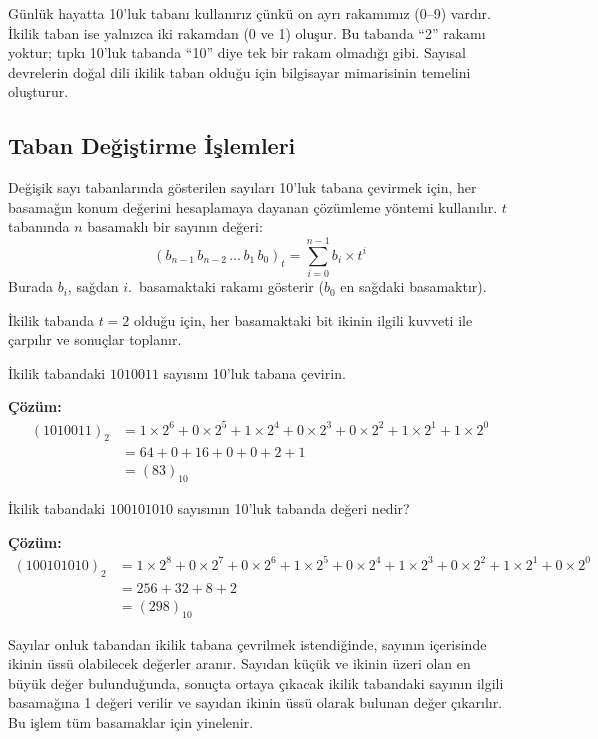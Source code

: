 Günlük hayatta 10'luk tabanı kullanırız çünkü on ayrı rakamımız (0--9) vardır. İkilik taban ise yalnızca iki rakamdan (0 ve 1) oluşur. Bu tabanda ``2'' rakamı yoktur; tıpkı 10'luk tabanda ``10'' diye tek bir rakam olmadığı gibi. Sayısal devrelerin doğal dili ikilik taban olduğu için bilgisayar mimarisinin temelini oluşturur.

\subsection{Taban Değiştirme İşlemleri}

Değişik sayı tabanlarında gösterilen sayıları 10'luk tabana çevirmek için, her basamağın konum değerini hesaplamaya dayanan çözümleme yöntemi kullanılır. $t$ tabanında $n$ basamaklı bir sayının değeri:
\begin{equation}
(b_{n-1}\, b_{n-2}\, \ldots\, b_1\, b_0)_t = \sum_{i=0}^{n-1} b_i \times t^i
\label{eq:taban-donusum}
\end{equation}
Burada $b_i$, sağdan $i$.~basamaktaki rakamı gösterir ($b_0$ en sağdaki basamaktır).

İkilik tabanda $t = 2$ olduğu için, her basamaktaki bit ikinin ilgili kuvveti ile çarpılır ve sonuçlar toplanır.

\begin{ornek}[A.1]
İkilik tabandaki $1010011$ sayısını 10'luk tabana çevirin.

\textbf{Çözüm:}
\begin{align*}
(1010011)_2 &= 1\times 2^6 + 0\times 2^5 + 1\times 2^4 + 0\times 2^3 + 0\times 2^2 + 1\times 2^1 + 1\times 2^0 \\
&= 64 + 0 + 16 + 0 + 0 + 2 + 1 \\
&= (83)_{10}
\end{align*}
\end{ornek}

\begin{ornek}[A.2]
İkilik tabandaki $100101010$ sayısının 10'luk tabanda değeri nedir?

\textbf{Çözüm:}
\begin{align*}
(100101010)_2 &= 1\times 2^8 + 0\times 2^7 + 0\times 2^6 + 1\times 2^5 + 0\times 2^4 + 1\times 2^3 + 0\times 2^2 + 1\times 2^1 + 0\times 2^0 \\
&= 256 + 32 + 8 + 2 \\
&= (298)_{10}
\end{align*}
\end{ornek}

Sayılar onluk tabandan ikilik tabana çevrilmek istendiğinde, sayının içerisinde ikinin üssü olabilecek değerler aranır. Sayıdan küçük ve ikinin üzeri olan en büyük değer bulunduğunda, sonuçta ortaya çıkacak ikilik tabandaki sayının ilgili basamağına 1 değeri verilir ve sayıdan ikinin üssü olarak bulunan değer çıkarılır. Bu işlem tüm basamaklar için yinelenir.

